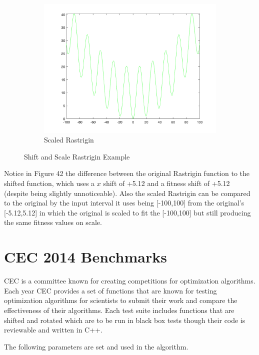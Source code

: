 \begin{figure}
\begin{subfigure}[b]{0.6\textwidth}
    \includegraphics[width=\textwidth]{img/translates/rastrigin/loa-graph-scale}
    \caption{Scaled Rastrigin}
  \end{subfigure}
  \caption{Shift and Scale Rastrigin Example}
\end{figure}

\par Notice in Figure 42 the difference between the original Rastrigin function to the shifted function, which uses a $x$ shift of +5.12 and a fitness shift of +5.12 (despite being slightly unnoticeable). Also the scaled Rastrigin can be compared to the original by the input interval it uses being [-100,100] from the original's [-5.12,5.12] in which the original is scaled to fit the [-100,100] but still producing the same fitness values on scale.

\clearpage

\section{CEC 2014 Benchmarks}

\par CEC is a committee known for creating competitions for optimization algorithms. Each year CEC provides a set of functions that are known for testing optimization algorithms for scientists to submit their work and compare the effectiveness of their algorithms. Each test suite includes functions that are shifted and rotated which are to be run in black box tests though their code is reviewable and written in C++.

\par The following parameters are set and used in the algorithm.

